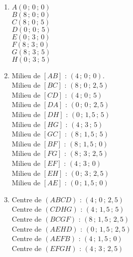\ \\ \vspace*{-9mm}
   \begin{multicols}{3}
   \begin{enumerate}
      \item {\blue
         $A(0\,;\,0\,;\,0)$ \\
         $B(8\,;\,0\,;\,0)$ \\
         $C(8\,;\,0\,;\,5)$ \\
         $D(0\,;\,0\,;\,5)$ \\
         $E(0\,;\,3\,;\,0)$ \\
         $F(8\,;\,3\,;\,0)$ \\
         $G(8\,;\,3\,;\,5)$ \\
         $H(0\,;\,3\,;\,5)$}
         \columnbreak
      \item  {\blue
         Milieu de $[AB]$ : $(4\,;\,0\,;\,0)$.\\
         Milieu de $[BC]$ : $(8\,;\,0\,;\,2,5)$ \\
         Milieu de $[CD]$ : $(4\,;\,0\,;\,5)$ \\
         Milieu de $[DA]$ : $(0\,;\,0\,;\,2,5)$ \\
         Milieu de $[DH]$ : $(0\,;\,1,5\,;\,5)$ \\
         Milieu de $[HG]$ : $(4\,;\,3\,;\,5)$ \\
         Milieu de $[GC]$ : $(8\,;\,1,5\,;\,5)$ \\
         Milieu de $[BF]$ : $(8\,;\,1,5\,;\,0)$ \\
         Milieu de $[FG]$ : $(8\,;\,3\,;\,2,5)$ \\
         Milieu de $[EF]$ : $(4\,;\,3\,;\,0)$ \\
         Milieu de $[EH]$ : $(0\,;\,3\,;\,2,5)$ \\
         Milieu de $[AE]$ : $(0\,;\,1,5\,;\,0)$}
         \columnbreak
      \item  {\blue
         Centre de $(ABCD)$ : $(4\,;\,0\,;\,2,5)$ \\
         Centre de $(CDHG)$ : $(4\,;\,1,5\,;\,5)$ \\
         Centre de $(BCGF)$ : $(8\,;\,1,5\,;\,2,5)$ \\
         Centre de $(AEHD)$ : $(0\,;\,1,5\,;\,2,5)$ \\
         Centre de $(AEFB)$ : $(4\,;\,1,5\,;\,0)$ \\
         Centre de $(EFGH)$ : $(4\,;\,3\,;\,2,5)$}
      \end{enumerate}
   \end{multicols}
